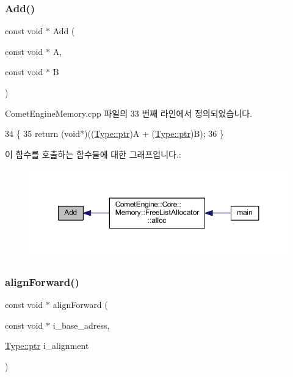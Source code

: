 \subsubsection{\texorpdfstring{Add()}{Add()}}
{\footnotesize\ttfamily const void $\ast$ Add (\begin{DoxyParamCaption}\item[{const void $\ast$}]{A,  }\item[{const void $\ast$}]{B }\end{DoxyParamCaption})}



Comet\+Engine\+Memory.\+cpp 파일의 33 번째 라인에서 정의되었습니다.


\begin{DoxyCode}
34 \{
35     \textcolor{keywordflow}{return} (\textcolor{keywordtype}{void}*)((\hyperlink{namespace_comet_engine_1_1_type_aeb22ad46de677e9a50679dfebeb0e6f0}{Type::ptr})A + (\hyperlink{namespace_comet_engine_1_1_type_aeb22ad46de677e9a50679dfebeb0e6f0}{Type::ptr})B);
36 \}
\end{DoxyCode}
이 함수를 호출하는 함수들에 대한 그래프입니다.\+:\nopagebreak
\begin{figure}[H]
\begin{center}
\leavevmode
\includegraphics[width=350pt]{namespace_comet_engine_1_1_core_1_1_memory_1_1_utils_a93ae170a43dac9da0116187242b35a6f_icgraph}
\end{center}
\end{figure}
\mbox{\label{namespace_comet_engine_1_1_core_1_1_memory_1_1_utils_a893da9f083981a41e4ada733c3d0661f}} 
\subsubsection{\texorpdfstring{align\+Forward()}{alignForward()}}
{\footnotesize\ttfamily const void $\ast$ align\+Forward (\begin{DoxyParamCaption}\item[{const void $\ast$}]{i\+\_\+base\+\_\+adress,  }\item[{\hyperlink{namespace_comet_engine_1_1_type_aeb22ad46de677e9a50679dfebeb0e6f0}{Type\+::ptr}}]{i\+\_\+alignment }\end{DoxyParamCaption})}



